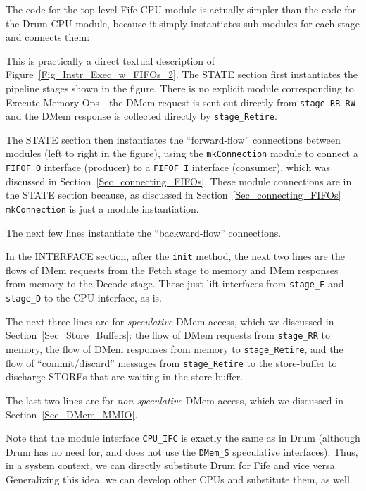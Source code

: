 \label{Sec_Fife_CPU_module}

The code for the top-level Fife CPU module is actually simpler than
the code for the Drum CPU module, because it simply instantiates
sub-modules for each stage and connects them:



This is practically a direct textual description of
Figure~\ref{Fig_Instr_Exec_w_FIFOs_2}.  The STATE section first
instantiates the pipeline stages shown in the figure.  There is no
explicit module corresponding to Execute Memory Ops---the DMem request
is sent out directly from \verb|stage_RR_RW| and the DMem response is
collected directly by \verb|stage_Retire|.

The STATE section then instantiates the ``forward-flow'' connections
between modules (left to right in the figure), using the
\verb|mkConnection| module to connect a \verb|FIFOF_O| interface
(producer) to a \verb|FIFOF_I| interface (consumer), which was
discussed in Section~\ref{Sec_connecting_FIFOs}.  These module
connections are in the STATE section because, as discussed in
Section~\ref{Sec_connecting_FIFOs} \verb|mkConnection| is just a
module instantiation.

The next few lines instantiate the ``backward-flow'' connections.

In the INTERFACE section, after the \verb|init| method, the next two
lines are the flows of IMem requests from the Fetch stage to memory
and IMem responses from memory to the Decode stage.  These just lift
interfaces from \verb|stage_F| and \verb|stage_D| to the CPU
interface, as is.

The next three lines are for \emph{speculative} DMem access, which we
discussed in Section~\ref{Sec_Store_Buffers}: the flow of DMem
requests from \verb|stage_RR| to memory, the flow of DMem responses
from memory to \verb|stage_Retire|, and the flow of ``commit/discard''
messages from \verb|stage_Retire| to the store-buffer to discharge
STOREs that are waiting in the store-buffer.

The last two lines are for \emph{non-speculative} DMem access, which
we discussed in Section~\ref{Sec_DMem_MMIO}.

Note that the module interface \verb|CPU_IFC| is exactly the same as
in Drum (although Drum has no need for, and does not use the
\verb|DMem_S| speculative interfaces).  Thus, in a system context, we
can directly substitute Drum for Fife and vice versa.  Generalizing
this idea, we can develop other CPUs and substitute them, as well.

